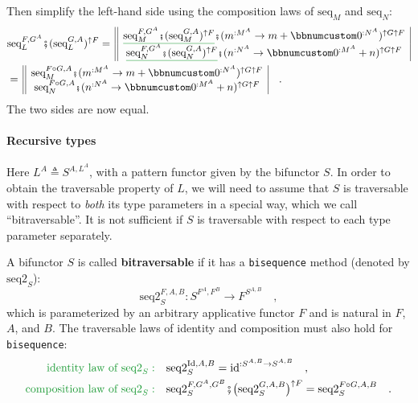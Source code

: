 Then simplify the left-hand side using the composition laws of $\text{seq}_{M}$
and $\text{seq}_{N}$:
\begin{align*}
 & \text{seq}_{L}^{F,G^{A}}\bef(\text{seq}_{L}^{G,A})^{\uparrow F}=\,\begin{array}{||c|}
\gunderline{\text{seq}_{M}^{F,G^{A}}\bef(\text{seq}_{M}^{G,A})^{\uparrow F}}\bef(m^{:M^{A}}\rightarrow m+\bbnum 0^{:N^{A}})^{\uparrow G\uparrow F}\\
\gunderline{\text{seq}_{N}^{F,G^{A}}\bef(\text{seq}_{N}^{G,A})^{\uparrow F}}\bef(n^{:N^{A}}\rightarrow\bbnum 0^{:M^{A}}+n)^{\uparrow G\uparrow F}
\end{array}\\
 & =\,\begin{array}{||c|}
\text{seq}_{M}^{F\circ G,A}\bef(m^{:M^{A}}\rightarrow m+\bbnum 0^{:N^{A}})^{\uparrow G\uparrow F}\\
\text{seq}_{N}^{F\circ G,A}\bef(n^{:N^{A}}\rightarrow\bbnum 0^{:M^{A}}+n)^{\uparrow G\uparrow F}
\end{array}\quad.
\end{align*}
The two sides are now equal.

\paragraph{Recursive types}

Here $L^{A}\triangleq S^{A,L^{A}}$, with a pattern functor given
by the bifunctor $S$. In order to obtain the traversable property
of $L$, we will need to assume that $S$ is traversable with respect
to \emph{both} its type parameters in a special way, which we call
\textsf{``}bitraversable\textsf{''}. It is not sufficient if $S$ is traversable with
respect to each type parameter separately.

A bifunctor $S$ is called \textbf{bitraversable}
if it has a \lstinline!bisequence! method (denoted by $\text{seq2}_{S}$):
\[
\text{seq2}_{S}^{F,A,B}:S^{F^{A},F^{B}}\rightarrow F^{S^{A,B}}\quad,
\]
which is parameterized by an arbitrary applicative functor $F$ and
is natural in $F$, $A$, and $B$. The traversable laws of identity
and composition
must also hold for \lstinline!bisequence!:
\begin{align}
{\color{greenunder}\text{identity law of }\text{seq2}_{S}:}\quad & \text{seq2}_{S}^{\text{Id},A,B}=\text{id}^{:S^{A,B}\rightarrow S^{A,B}}\quad,\label{eq:identity-law-of-bisequence}\\
{\color{greenunder}\text{composition law of }\text{seq2}_{S}:}\quad & \text{seq2}_{S}^{F,G^{A},G^{B}}\bef\big(\text{seq2}_{S}^{G,A,B}\big)^{\uparrow F}=\text{seq2}_{S}^{F\circ G,A,B}\quad.\label{eq:composition-law-of-bisequence}
\end{align}

